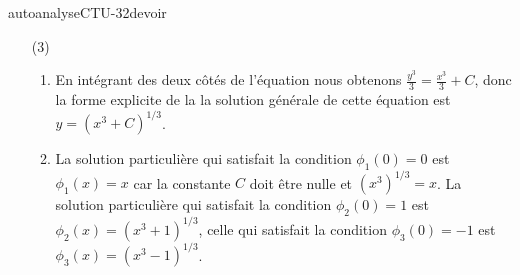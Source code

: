 
\begin{corrige}{autoanalyseCTU-32devoir}

\begin{enumerate}
\item[(3)]
  \begin{enumerate}
  \item En intégrant des deux c\^otés de l'équation nous obtenons  $\displaystyle \frac{y^3}{3}=\frac{x^3}{3}+C$, donc la forme explicite de la la solution générale de cette équation est $\displaystyle y=\left(x^3+C\right)^{1/3}$.
  \item La solution particulière qui satisfait la condition $\phi_1(0)=0$ est $\phi_1(x)=x$ car la constante $C$ doit \^etre nulle et $\left(x^3\right)^{1/3}=x$.
La solution particulière qui satisfait la condition $\phi_2(0)=1$ est $\phi_2(x)=\left(x^3+1\right)^{1/3}$, celle qui satisfait la condition $\phi_3(0)=-1$ est $\phi_3(x)=\left(x^3-1\right)^{1/3}$. 
  \end{enumerate}
\end{enumerate}


\end{corrige}   
